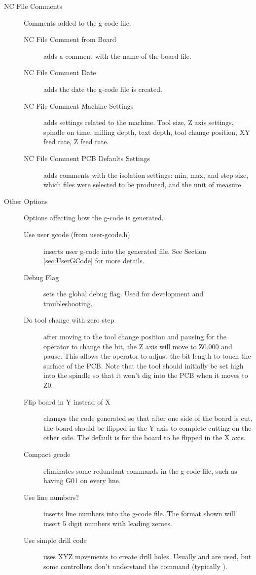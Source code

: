 \documentclass[11pt]{book}
\begin{document}
\begin{description}
	\item[NC File Comments] Comments added to the g-code file.
	\begin{description}
		\item[NC File Comment from Board] adds a comment with the name of the board file.
		\item[NC File Comment Date] adds the date the g-code file is created.
		\item[NC File Comment Machine Settings] adds settings related to the machine. Tool size, Z axis settings, spindle on time, milling depth, text depth, tool change position, XY feed rate, Z feed rate.
		\item[NC File Comment PCB Defaults Settings] adds comments with the isolation settings: min, max, and step size, which files were selected to be produced, and the unit of measure.
	\end{description}
	
	\item[Other Options] Options affecting how the g-code is generated.
	\begin{description}
		\item[Use user gcode (from user-gcode.h)] inserts user g-code into the generated file. See Section \vref{sec:UserGCode} for more details.
		\item[Debug Flag] sets the global debug flag. Used for development and troubleshooting.
		\item[Do tool change with zero step] after moving to the tool change position and pausing for the operator to change the bit, the Z axis will move to Z0.000 and pause. This allows the operator to adjust the bit length to touch the surface of the PCB. Note that the tool should initially be set high into the spindle so that it won't dig into the PCB when it moves to Z0.
		\item[Flip board in Y instead of X] changes the code generated so that after one side of the board is cut, the board should be flipped in the Y axis to complete cutting on the other side. The default is for the board to be flipped in the X axis.
		\item[Compact gcode] eliminates some redundant commands in the g-code file, such as having G01 on every line.
		\item[Use line numbers?] inserts line numbers into the g-code file. The format shown  will insert 5 digit numbers with leading zeroes.
		\item[Use simple drill code] uses XYZ movements to create drill holes. Usually  and  are used, but some controllers don't understand the command (typically ).
	\end{description}
	

\end{description}
\end{document}
